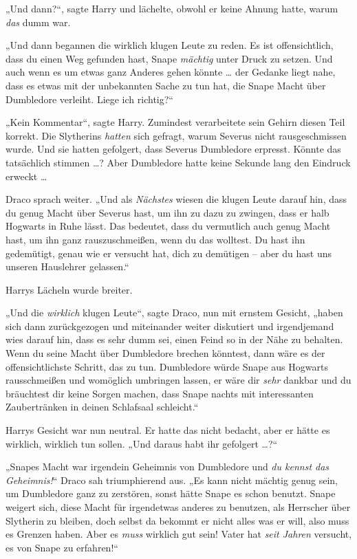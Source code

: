 {„Und dann?“, sagte Harry und lächelte, obwohl er keine Ahnung hatte, warum \emph{das} dumm war.

„Und dann begannen die wirklich klugen Leute zu reden. Es ist offensichtlich, dass du einen Weg gefunden hast, Snape \emph{mächtig} unter Druck zu setzen. Und auch wenn es um etwas ganz Anderes gehen könnte … der Gedanke liegt nahe, dass es etwas mit der unbekannten Sache zu tun hat, die Snape Macht über Dumbledore verleiht. Liege ich richtig?“

„Kein Kommentar“, sagte Harry. Zumindest verarbeitete sein Gehirn diesen Teil korrekt. Die Slytherins \emph{hatten} sich gefragt, warum Severus nicht rausgeschmissen wurde. Und sie hatten gefolgert, dass Severus Dumbledore erpresst. Könnte das tatsächlich stimmen …? Aber Dumbledore hatte keine Sekunde lang den Eindruck erweckt …

Draco sprach weiter. „Und als \emph{Nächstes} wiesen die klugen Leute darauf hin, dass du genug Macht über Severus hast, um ihn zu dazu zu zwingen, dass er halb Hogwarts in Ruhe lässt. Das bedeutet, dass du vermutlich auch genug Macht hast, um ihn ganz rauszuschmeißen, wenn du das wolltest. Du hast ihn gedemütigt, genau wie er versucht hat, dich zu demütigen -- aber du hast uns unseren Hauslehrer gelassen.“

Harrys Lächeln wurde breiter.

„Und die \emph{wirklich} klugen Leute“, sagte Draco, nun mit ernstem Gesicht, „haben sich dann zurückgezogen und miteinander weiter diskutiert und irgendjemand wies darauf hin, dass es sehr dumm sei, einen Feind so in der Nähe zu behalten. Wenn du seine Macht über Dumbledore brechen könntest, dann wäre es der offensichtlichste Schritt, das zu tun. Dumbledore würde Snape aus Hogwarts rausschmeißen und womöglich umbringen lassen, er wäre dir \emph{sehr} dankbar und du bräuchtest dir keine Sorgen machen, dass Snape nachts mit interessanten Zaubertränken in deinen Schlafsaal schleicht.“

Harrys Gesicht war nun neutral. Er hatte das nicht bedacht, aber er hätte es wirklich, wirklich tun sollen. „Und daraus habt ihr gefolgert …?“

„Snapes Macht war irgendein Geheimnis von Dumbledore und \emph{du kennst das Geheimnis!}“ Draco sah triumphierend aus. „Es kann nicht mächtig genug sein, um Dumbledore ganz zu zerstören, sonst hätte Snape es schon benutzt. Snape weigert sich, diese Macht für irgendetwas anderes zu benutzen, als Herrscher über Slytherin zu bleiben, doch selbst da bekommt er nicht alles was er will, also muss es Grenzen haben. Aber es \emph{muss} wirklich gut sein! Vater hat \emph{seit Jahren} versucht, es von Snape zu erfahren!“

}

